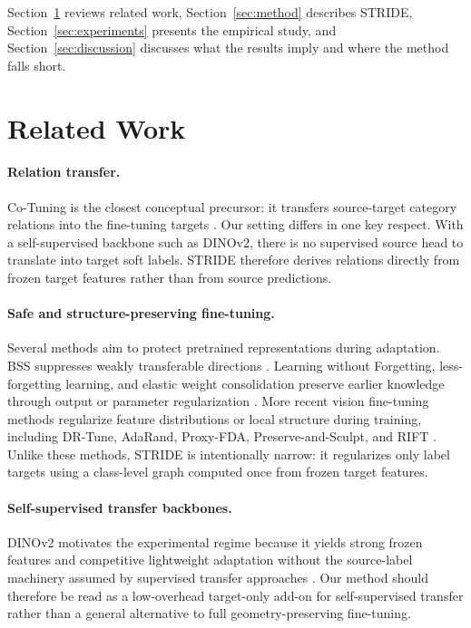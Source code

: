 \documentclass{article}
\newcommand{\method}{STRIDE\xspace}
\begin{document}
Section~\ref{sec:related} reviews related work, Section~\ref{sec:method} describes \method, Section~\ref{sec:experiments} presents the empirical study, and Section~\ref{sec:discussion} discusses what the results imply and where the method falls short.

\section{Related Work}
\label{sec:related}

\paragraph{Relation transfer.}
Co-Tuning is the closest conceptual precursor: it transfers source-target category relations into the fine-tuning targets \citep{you2020cotuning}. Our setting differs in one key respect. With a self-supervised backbone such as DINOv2, there is no supervised source head to translate into target soft labels. \method therefore derives relations directly from frozen target features rather than from source predictions.

\paragraph{Safe and structure-preserving fine-tuning.}
Several methods aim to protect pretrained representations during adaptation. BSS suppresses weakly transferable directions \citep{chen2019bss}. Learning without Forgetting, less-forgetting learning, and elastic weight consolidation preserve earlier knowledge through output or parameter regularization \citep{li2016learning,jung2016less,kirkpatrick2017overcoming}. More recent vision fine-tuning methods regularize feature distributions or local structure during training, including DR-Tune, AdaRand, Proxy-FDA, Preserve-and-Sculpt, and RIFT \citep{Zhou_2023_ICCV,yamaguchi2024adarand,huang2025proxy,chen2025preserve,zu2025exploring}. Unlike these methods, \method is intentionally narrow: it regularizes only label targets using a class-level graph computed once from frozen target features.

\paragraph{Self-supervised transfer backbones.}
DINOv2 motivates the experimental regime because it yields strong frozen features and competitive lightweight adaptation without the source-label machinery assumed by supervised transfer approaches \citep{oquab2024dinov2}. Our method should therefore be read as a low-overhead target-only add-on for self-supervised transfer rather than a general alternative to full geometry-preserving fine-tuning.
\end{document}

